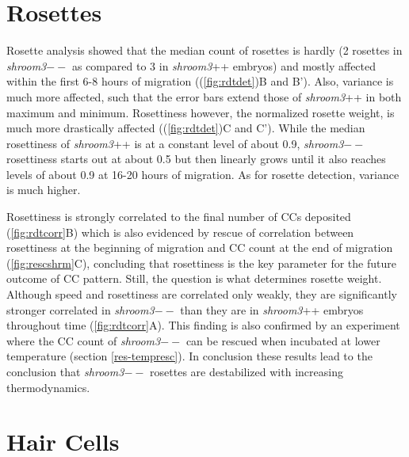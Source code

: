 \documentclass[11pt,singlespacinge,twoside]{reedthesis} %
\begin{document}
\hypertarget{rosettes}{%
\section{Rosettes}\label{rosettes}}

Rosette analysis showed that the median count of rosettes is hardly (2 rosettes in \emph{shroom3}\(--\) as compared to 3 in \emph{shroom3}++ embryos) and mostly affected within the first 6-8 hours of migration ((\ref{fig:rdtdet})B and B'). Also, variance is much more affected, such that the error bars extend those of \emph{shroom3}++ in both maximum and minimum. Rosettiness however, the normalized rosette weight, is much more drastically affected ((\ref{fig:rdtdet})C and C'). While the median rosettiness of \emph{shroom3}++ is at a constant level of about 0.9, \emph{shroom3}\(--\) rosettiness starts out at about 0.5 but then linearly grows until it also reaches levels of about 0.9 at 16-20 hours of migration. As for rosette detection, variance is much higher.

Rosettiness is strongly correlated to the final number of CCs deposited (\ref{fig:rdtcorr}B) which is also evidenced by rescue of correlation between rosettiness at the beginning of migration and CC count at the end of migration (\ref{fig:rescshrm}C), concluding that rosettiness is the key parameter for the future outcome of CC pattern. Still, the question is what determines rosette weight. Although speed and rosettiness are correlated only weakly, they are significantly stronger correlated in \emph{shroom3}\(--\) than they are in \emph{shroom3}++ embryos throughout time (\ref{fig:rdtcorr}A). This finding is also confirmed by an experiment where the CC count of \emph{shroom3}\(--\) can be rescued when incubated at lower temperature (section \ref{res-tempresc}). In conclusion these results lead to the conclusion that \emph{shroom3}\(--\) rosettes are destabilized with increasing thermodynamics.

\hypertarget{hair-cells}{%
\section{Hair Cells}\label{hair-cells}}
\end{document}
